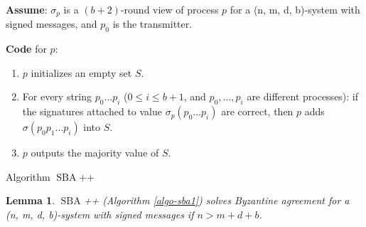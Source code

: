 \documentclass[11pt,conference,compsoc,onecolumn,romanappendices]{IEEEtran}
\newcommand{\tmop}[1]{\ensuremath{\operatorname{#1}}}
\newcommand{\tmstrong}[1]{\textbf{#1}}
\newenvironment{enumeratenumeric}{\begin{enumerate}[1.] }{\end{enumerate}}
\newenvironment{fkindent}{\begin{tmparmod}{0.0em}{1.0em}{0pt} }{\end{tmparmod}}
\newenvironment{tmparmod}[3]{\begin{list}{}{\setlength{\topsep}{0pt}\setlength{\leftmargin}{#1}\setlength{\rightmargin}{#2}\setlength{\parindent}{#3}\setlength{\listparindent}{\parindent}\setlength{\itemindent}{\parindent}\setlength{\parsep}{\parskip}} \item[]}{\end{list}}
\newtheorem{lemma}{Lemma}
\begin{document}
\begin{algorithm}[h]
    {\tmstrong{Assume}}: $\sigma_p$ is a $(b + 2)$-round view of process $p$
    for a (n, m, d, b)-system with signed messages, and $p_0$ is the
    transmitter.
    
    {\tmstrong{Code}} for $p$:
    \begin{fkindent}
      \begin{enumeratenumeric}
        \item $p$ initializes an empty set $S$.
        
        \item For every string $p_0 \ldots p_i$ ($0 \leqslant i \leqslant b +
        1$, and $p_0, \ldots, p_i$ are different processes): if the signatures
        attached to value $\sigma_p (p_0 \ldots p_i)$ are correct, then $p$
        adds $\sigma (p_0 p_1 \ldots p_i)$ into $S$.
        
        \item $p$ outputs the majority value of $S$.
      \end{enumeratenumeric}
    \end{fkindent}
    \caption{Algorithm $\tmop{SBA}$++\label{algo-sba1}}
\end{algorithm}

\iffalse
\begin{lemma}
  $\tmop{SBA}$++ (Algorithm \ref{algo-sba1}) solves Byzantine agreement for a (n,
  m, d, b)-system with signed messages if $n > m + d + b$.
\end{lemma}
\end{document}
